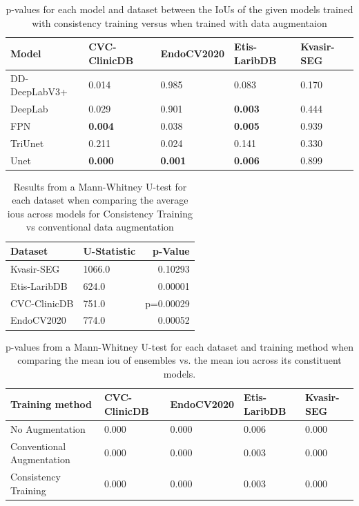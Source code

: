 \begin{table}[htb]
    \centering
    \begin{tabularx}{\linewidth}{lXXXX}
    \toprule
      Model & CVC-ClinicDB & EndoCV2020 & Etis-LaribDB & Kvasir-SEG\\
      \midrule
      DD-DeepLabV3+ & 0.014 & 0.985 & 0.083 & 0.170\\
      DeepLab       & 0.029 & 0.901 & \textbf{0.003} & 0.444\\
      FPN           & \textbf{0.004} & 0.038 & \textbf{0.005} & 0.939\\
      TriUnet       & 0.211 & 0.024 & 0.141 & 0.330\\
      Unet          & \textbf{0.000} & \textbf{0.001} & \textbf{0.006} & 0.899\\
      \bottomrule
    \end{tabularx}
    \caption[T-test results consistency training]{p-values for each model and dataset between the IoUs of the given models trained with consistency training versus when trained with data augmentaion}
    \label{tab:ttest_per_dataset_consistency}
\end{table}
\begin{table}[htb]
    \centering
    \begin{tabularx}{\linewidth}{lXr}
            \toprule
            Dataset & U-Statistic & p-Value \\
            \midrule
            Kvasir-SEG & 1066.0 & 0.10293 \\
            Etis-LaribDB & 624.0 & 0.00001\\
            CVC-ClinicDB & 751.0& p=0.00029 \\
            EndoCV2020 & 774.0 & 0.00052    \\
            \bottomrule
        \end{tabularx}
        \caption[Mann-Whitney U-test results consistency training averaged across models]{Results from a Mann-Whitney U-test for each dataset when comparing the average \glspl{iou} across models for Consistency Training vs conventional data augmentation}
        \label{tab:ttest_avgs_consistency}
    \end{table}
    
\begin{table}[]
    \centering
  \begin{tabularx}{\linewidth}{lXXXX}
    \toprule
    Training method & CVC-ClinicDB & EndoCV2020 & Etis-LaribDB& Kvasir-SEG \\
    \midrule
    No Augmentation             & 0.000 & 0.000 & 0.006 & 0.000 \\ 
    Conventional Augmentation   & 0.000 & 0.000 & 0.003 & 0.000 \\ 
    Consistency Training        & 0.000 & 0.000 & 0.003 & 0.000 \\
    \bottomrule
\end{tabularx}
    \caption{p-values from a Mann-Whitney U-test for each dataset and training method when comparing the mean \gls{iou} of ensembles vs. the mean \gls{iou} across its constituent models.}
    \label{tab:ensemble_v_singular}
\end{table}


